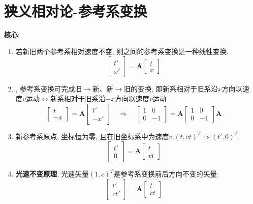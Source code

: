 \documentclass{article}
\newcommand{\env}[2]{\begin{#1}#2\end{#1}}
\begin{document}
\section{狭义相对论-参考系变换}
    \textbf{核心}: 
        \env{enumerate}{
        \item 若新旧两个参考系相对速度不变, 则之间的参考系变换是一种线性变换.
            \[\begin{bmatrix}t' \\ x'\end{bmatrix} = \boldsymbol A \begin{bmatrix}t \\ x\end{bmatrix}\]
        \item \text{运动相对性}, 参考系变换可完成旧$\to$新、新$\to$旧的变换, 即新系相对于旧系沿$x$方向以速度$v$运动$\Leftrightarrow$新系相对于旧系沿$-x$方向以速度$v$运动
            \[\begin{bmatrix}t \\ -x\end{bmatrix} = \boldsymbol A \begin{bmatrix}t' \\ -x'\end{bmatrix} \quad \Rightarrow \quad \begin{bmatrix}1 & 0 \\ 0 & -1\end{bmatrix} = \boldsymbol A \begin{bmatrix}1 & 0 \\ 0 & -1\end{bmatrix} \boldsymbol A\]
        \item 新参考系原点, 坐标恒为零, 且在旧坐标系中为速度$v$.\quad $(t,vt)^T \Rightarrow (t',0)^T$. 
            \[\begin{bmatrix}t' \\ 0 \end{bmatrix} = \boldsymbol A \begin{bmatrix}t \\ v t\end{bmatrix}\]
        \item \textbf{光速不变原理}, 光速矢量$(1, c)^T$是参考系变换前后方向不变的矢量. 
            \[\begin{bmatrix}t' \\ ct' \end{bmatrix} = \boldsymbol A \begin{bmatrix}t \\ ct\end{bmatrix}\]
        }
\end{document}
